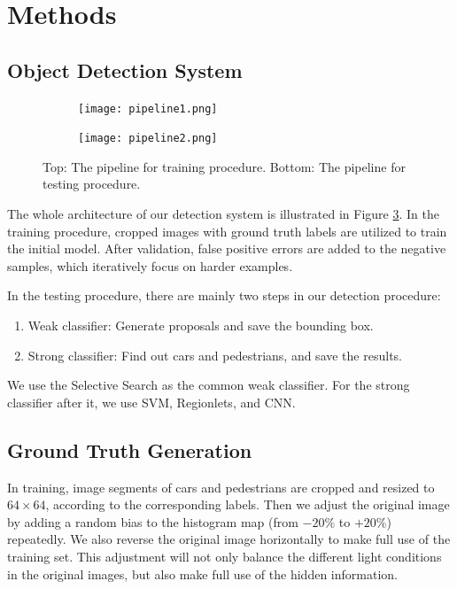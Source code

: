 \documentclass{article} %
\begin{document}
\section{Methods}

\subsection{Object Detection System}

\begin{figure}[htb]
\begin{subfigure}
    \centering
    \texttt{[image: pipeline1.png]}
    \label{fig:pipeline1}
\end{subfigure}
\begin{subfigure}
    \centering
    \texttt{[image: pipeline2.png]}
    \label{fig:pipeline2}
\end{subfigure}
\caption{Top: The pipeline for training procedure. Bottom: The pipeline for testing procedure.
\label{fig:pipeline}}
\end{figure}

The whole architecture of our detection system is illustrated in Figure \ref{fig:pipeline}. In the training procedure, cropped images with ground truth labels are utilized to train the initial model. After validation, false positive errors are added to the negative samples, which iteratively focus on harder examples. 

In the testing procedure, there are mainly two steps in our detection procedure: 
\begin{enumerate}[Step 1]
    \item Weak classifier: Generate proposals and save the bounding box.
    \item Strong classifier: Find out cars and pedestrians, and save the results.
\end{enumerate}

We use the Selective Search \cite{van2011segmentation} as the common weak classifier. For the strong classifier after it, we use SVM, Regionlets, and CNN.

\subsection{Ground Truth Generation}
\label{sec:positive}

In training, image segments of cars and pedestrians are cropped and resized to $64 \times 64$, according to the corresponding labels. Then we adjust the original image by adding a random bias to the histogram map (from $-20\%$ to $+20\%$) repeatedly. We also reverse the original image horizontally to make full use of the training set. This adjustment will not only balance the different light conditions in the original images, but also make full use of the hidden information. 
\end{document}
